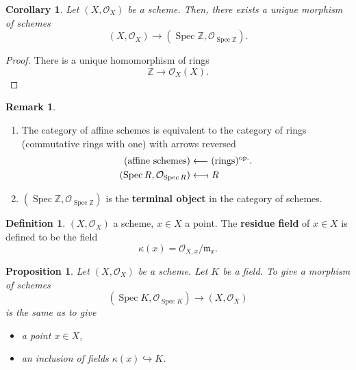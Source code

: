 \documentclass[12pt]{article}
\DeclareMathOperator{\Spec}{Spec}
\newtheorem*{proposition}{Proposition}
\newtheorem*{corollary}{Corollary}
\theoremstyle{definition}
\newtheorem*{definition}{Definition}
\newtheorem*{remark}{Remark}
\begin{document}
\begin{corollary}
Let $(X,\mathcal O_X)$ be a scheme. Then, there exists a unique morphism of schemes
\[(X,\mathcal O_X)\longrightarrow(\Spec\mathbb Z,\mathcal O_{\Spec\mathbb Z}).\]
\end{corollary}

\begin{proof}
There is a unique homomorphism of rings
\[\mathbb Z\longrightarrow\mathcal O_X(X).\]
\end{proof}

\begin{remark}
\begin{enumerate}[label=\arabic*)]
\item The category of affine schemes is equivalent to the category of rings (commutative rings with one) with arrows reversed
\begin{align*}
(\text{affine schemes})&\longleftarrow(\text{rings})^\text{op.}.\\(\Spec R,\mathcal O_{\Spec R})&\longleftarrow\!\shortmid R
\end{align*}

\item $(\Spec\mathbb Z,\mathcal O_{\Spec\mathbb Z})$ is the \textbf{terminal object} in the category of schemes.
\end{enumerate}
\end{remark}

\begin{definition}
$(X,\mathcal O_X)$ a scheme, $x\in X$ a point. The \textbf{residue field} of $x\in X$ is defined to be the field
\[\kappa(x)=\mathcal O_{X,x}/\mathfrak m_x.\]
\end{definition}

\begin{proposition}
Let $(X,\mathcal O_X)$ be a scheme. Let $K$ be a field. To give a morphism of schemes
\[(\Spec K,\mathcal O_{\Spec K})\longrightarrow(X,\mathcal O_X)\]
is the same as to give
\begin{itemize}[label=$-$]
\item a point $x\in X$,
\item an inclusion of fields $\kappa(x)\hookrightarrow K$.
\end{itemize}
\end{proposition}
\end{document}
